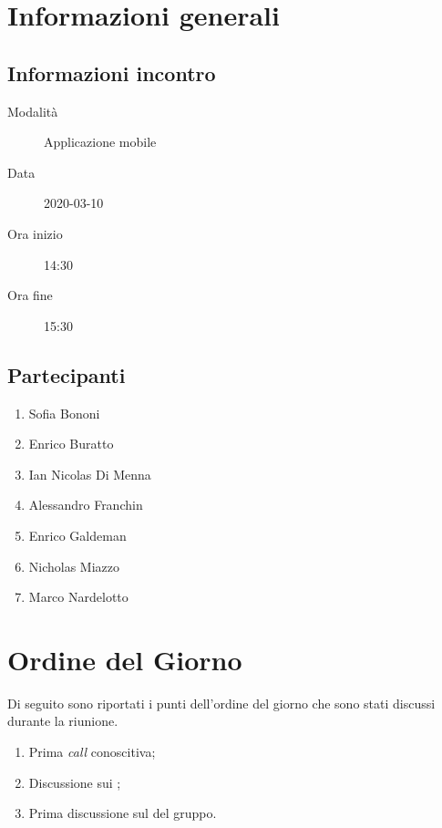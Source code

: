 \documentclass{article}
\begin{document}


\section{Informazioni generali}%
\label{sec:informazioni_generali}

\subsection{Informazioni incontro}%
\label{sub:informazioni_incontro}

\begin{description}
  \item[Modalità] Applicazione mobile 
  \item[Data] 2020-03-10
  \item[Ora inizio] 14:30
  \item[Ora fine] 15:30
\end{description}

\subsection{Partecipanti}%
\label{sub:partecipanti}

\begin{enumerate}
  \item Sofia Bononi
  \item Enrico Buratto
  \item Ian Nicolas Di Menna
  \item Alessandro Franchin
  \item Enrico Galdeman
  \item Nicholas Miazzo
  \item Marco Nardelotto
\end{enumerate}

\section{Ordine del Giorno}%
\label{ordine_del_giorno}
Di seguito sono riportati i punti dell'ordine del giorno che sono stati discussi durante la riunione.
\begin{enumerate}
  \item Prima \textit{call} conoscitiva;
  \item Discussione sui ;
  \item Prima discussione sul  del gruppo.
\end{enumerate}
\end{document}
